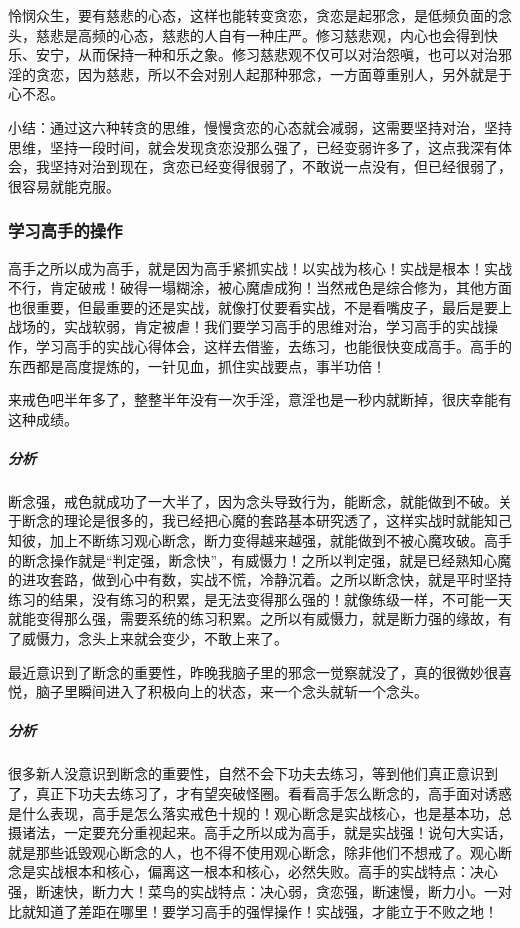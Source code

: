 怜悯众生，要有慈悲的心态，这样也能转变贪恋，贪恋是起邪念，是低频负面的念头，慈悲是高频的心态，慈悲的人自有一种庄严。修习慈悲观，内心也会得到快乐、安宁，从而保持一种和乐之象。修习慈悲观不仅可以对治怨嗔，也可以对治邪淫的贪恋，因为慈悲，所以不会对别人起那种邪念，一方面尊重别人，另外就是于心不忍。

小结：通过这六种转贪的思维，慢慢贪恋的心态就会减弱，这需要坚持对治，坚持思维，坚持一段时间，就会发现贪恋没那么强了，已经变弱许多了，这点我深有体会，我坚持对治到现在，贪恋已经变得很弱了，不敢说一点没有，但已经很弱了，很容易就能克服。


\subsubsection{学习高手的操作}

高手之所以成为高手，就是因为高手紧抓实战！以实战为核心！实战是根本！实战不行，肯定破戒！破得一塌糊涂，被心魔虐成狗！当然戒色是综合修为，其他方面也很重要，但最重要的还是实战，就像打仗要看实战，不是看嘴皮子，最后是要上战场的，实战软弱，肯定被虐！我们要学习高手的思维对治，学习高手的实战操作，学习高手的实战心得体会，这样去借鉴，去练习，也能很快变成高手。高手的东西都是高度提炼的，一针见血，抓住实战要点，事半功倍！

\begin{case}
    来戒色吧半年多了，整整半年没有一次手淫，意淫也是一秒内就断掉，很庆幸能有这种成绩。
    \subparagraph{分析} 断念强，戒色就成功了一大半了，因为念头导致行为，能断念，就能做到不破。关于断念的理论是很多的，我已经把心魔的套路基本研究透了，这样实战时就能知己知彼，加上不断练习观心断念，断力变得越来越强，就能做到不被心魔攻破。高手的断念操作就是“判定强，断念快”，有威慑力！之所以判定强，就是已经熟知心魔的进攻套路，做到心中有数，实战不慌，冷静沉着。之所以断念快，就是平时坚持练习的结果，没有练习的积累，是无法变得那么强的！就像练级一样，不可能一天就能变得那么强，需要系统的练习积累。之所以有威慑力，就是断力强的缘故，有了威慑力，念头上来就会变少，不敢上来了。
\end{case}

\begin{case}
    最近意识到了断念的重要性，昨晚我脑子里的邪念一觉察就没了，真的很微妙很喜悦，脑子里瞬间进入了积极向上的状态，来一个念头就斩一个念头。
    \subparagraph{分析} 很多新人没意识到断念的重要性，自然不会下功夫去练习，等到他们真正意识到了，真正下功夫去练习了，才有望突破怪圈。看看高手怎么断念的，高手面对诱惑是什么表现，高手是怎么落实戒色十规的！观心断念是实战核心，也是基本功，总摄诸法，一定要充分重视起来。高手之所以成为高手，就是实战强！说句大实话，就是那些诋毁观心断念的人，也不得不使用观心断念，除非他们不想戒了。观心断念是实战根本和核心，偏离这一根本和核心，必然失败。高手的实战特点：决心强，断速快，断力大！菜鸟的实战特点：决心弱，贪恋强，断速慢，断力小。一对比就知道了差距在哪里！要学习高手的强悍操作！实战强，才能立于不败之地！
\end{case}

